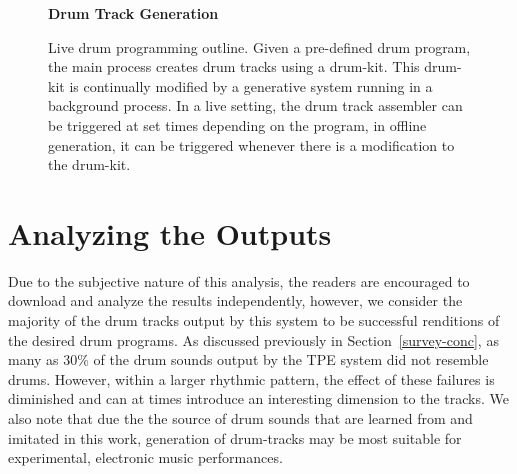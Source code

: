\documentclass[\main/thesis.tex]{subfiles}
\begin{document}
\begin{figure}[tpb]
    \begin{center}
    \textbf{Drum Track Generation}
    \end{center}
    \caption{Live drum programming outline. Given a pre-defined drum program, the main process creates drum tracks using a drum-kit. This drum-kit is continually modified by a generative system running in a background process. In a live setting, the drum track assembler can be triggered at set times depending on the program, in offline generation, it can be triggered whenever there is a modification to the drum-kit.  }
\label{fig:live_drumming}
\end{figure} 

\section{Analyzing the Outputs}
 Due to the subjective nature of this analysis, the readers are encouraged to download and analyze the results independently, however, we consider the majority of the drum tracks output by this system to be successful renditions of the desired drum programs. As discussed previously in Section~\ref{survey-conc}, as many as 30\% of the drum sounds output by the TPE system did not resemble drums. However, within a larger rhythmic pattern, the effect of these failures is diminished and can at times introduce an interesting dimension to the tracks. We also note that due the the source of drum sounds that are learned from and imitated in this work, generation of drum-tracks may be most suitable for experimental, electronic music performances.
 
\end{document}
